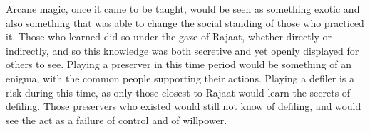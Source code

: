Arcane magic, once it came to be taught, would be seen as something exotic and also something that was able to change the social standing of those who practiced it. Those who learned did so under the gaze of Rajaat, whether directly or indirectly, and so this knowledge was both secretive and yet openly displayed for others to see. Playing a preserver in this time period would be something of an enigma, with the common people supporting their actions. Playing a defiler is a risk during this time, as only those closest to Rajaat would learn the secrets of defiling. Those preservers who existed would still not know of defiling, and would see the act as a failure of control and of willpower.

